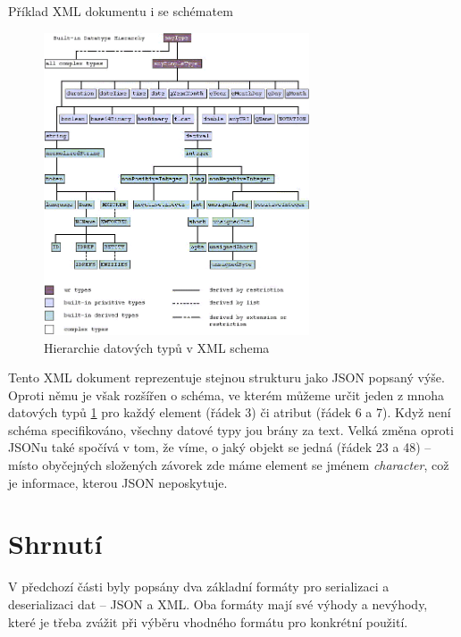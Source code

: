 \begin{listing}[H]
    \inputminted{xml}{resources/code/standards/player.xml}
    \caption{Příklad XML dokumentu i se schématem}
    \label{code:xml_player}
\end{listing}

\begin{figure}[H]
    \centering
    \includegraphics[width=0.7\textwidth]{figures/type-hierarchy.png}
    \caption{Hierarchie datových typů v XML schema}%
    \label{fig:xml_datatypes}
\end{figure}


Tento XML dokument reprezentuje stejnou strukturu jako JSON popsaný výše. Oproti němu je však rozšířen o schéma, ve kterém můžeme určit jeden z mnoha datových typů \ref{fig:xml_datatypes} pro každý element (řádek 3) či atribut (řádek 6 a 7). Když není schéma specifikováno, všechny datové typy jou brány za text. Velká změna oproti JSONu také spočívá v tom, že víme, o jaký objekt se jedná (řádek 23 a 48) -- místo obyčejných složených závorek zde máme element se jménem \textit{character}, což je informace, kterou JSON neposkytuje.


\section{Shrnutí}
V předchozí části byly popsány dva základní formáty pro serializaci a deserializaci dat -- JSON a XML. Oba formáty mají své výhody a nevýhody, které je třeba zvážit při výběru vhodného formátu pro konkrétní použití.

